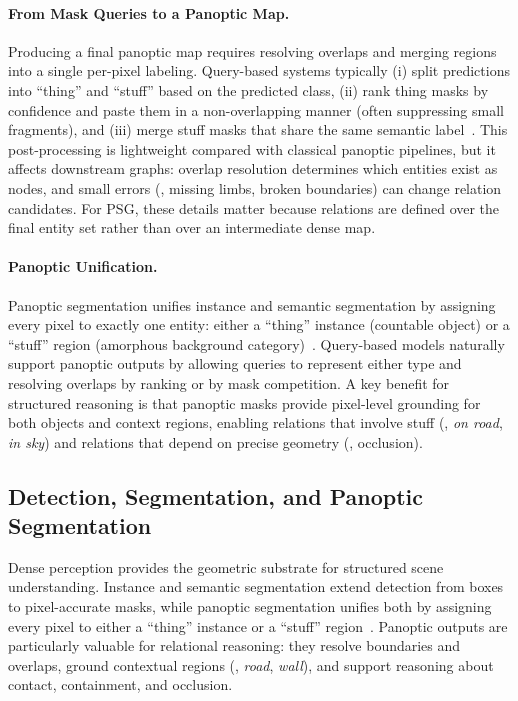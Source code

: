 \paragraph{From Mask Queries to a Panoptic Map.}
Producing a final panoptic map requires resolving overlaps and merging regions into a single per-pixel labeling. Query-based systems typically (i) split predictions into ``thing'' and ``stuff'' based on the predicted class, (ii) rank thing masks by confidence and paste them in a non-overlapping manner (often suppressing small fragments), and (iii) merge stuff masks that share the same semantic label~\citep{kirillov2019panoptic, cheng2022masked}. This post-processing is lightweight compared with classical panoptic pipelines, but it affects downstream graphs: overlap resolution determines which entities exist as nodes, and small errors (\eg, missing limbs, broken boundaries) can change relation candidates. For PSG, these details matter because relations are defined over the final entity set rather than over an intermediate dense map.

\paragraph{Panoptic Unification.}
Panoptic segmentation unifies instance and semantic segmentation by assigning every pixel to exactly one entity: either a ``thing'' instance (countable object) or a ``stuff'' region (amorphous background category)~\citep{kirillov2019panoptic}. Query-based models naturally support panoptic outputs by allowing queries to represent either type and resolving overlaps by ranking or by mask competition. A key benefit for structured reasoning is that panoptic masks provide pixel-level grounding for both objects and context regions, enabling relations that involve stuff (\eg, \emph{on road}, \emph{in sky}) and relations that depend on precise geometry (\eg, occlusion).

\subsection{Detection, Segmentation, and Panoptic Segmentation}
Dense perception provides the geometric substrate for structured scene understanding. Instance and semantic segmentation extend detection from boxes to pixel-accurate masks, while panoptic segmentation unifies both by assigning every pixel to either a ``thing'' instance or a ``stuff'' region~\citep{kirillov2019panoptic}. Panoptic outputs are particularly valuable for relational reasoning: they resolve boundaries and overlaps, ground contextual regions (\eg, \emph{road}, \emph{wall}), and support reasoning about contact, containment, and occlusion.

